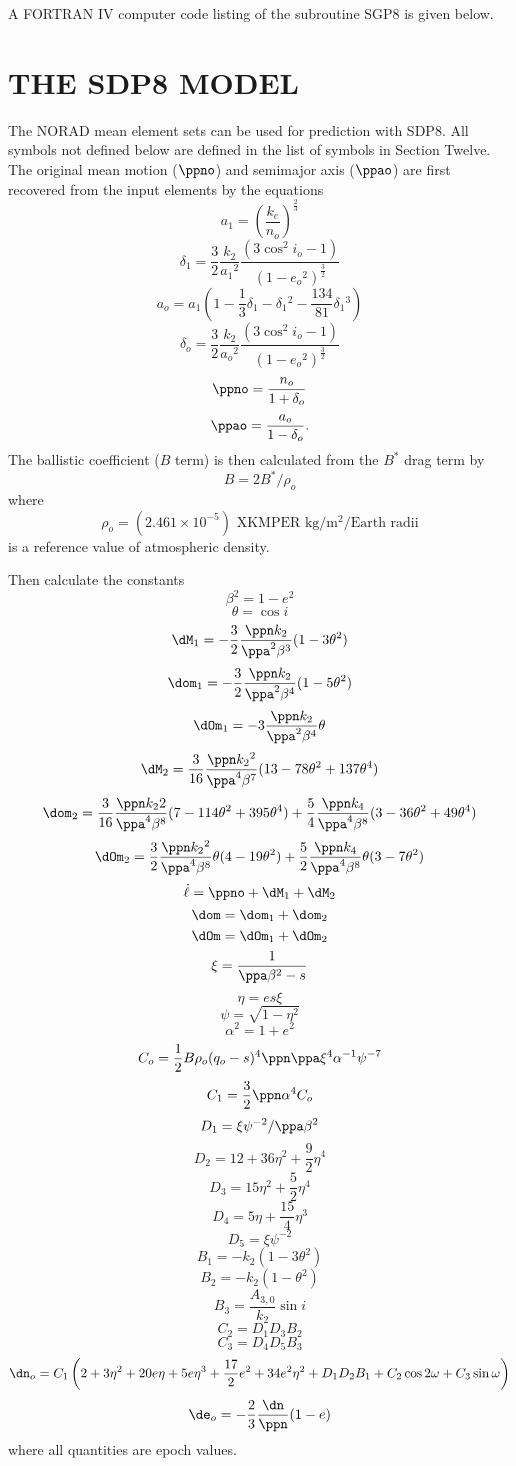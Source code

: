 A FORTRAN IV computer code listing of the subroutine SGP8 is given below.
\newpage

\newpage
\section[The SDP8 Model]{THE SDP8 MODEL}
The NORAD mean element sets can be used for prediction with SDP8.  All symbols
not defined below are defined in the list of symbols in Section Twelve.  The
original mean motion ($\ppno$) and semimajor axis ($\ppao$) are first
recovered from the input elements by the equations
\[a_1=\left(\dfrac{k_e}{n_o}\right)^{\frac23}\]
\[\delta_1=\frac32\frac{k_2}{a_1{}^2}\frac{(3\cos^2i_o-1)}
{(1-e_o{}^2)^\frac32}\]
\[a_o=a_1\left(1-\dfrac13\delta_1-\delta_1{}^2
-\dfrac{134}{81}\delta_1{}^3\right)\]
\[\delta_o=\dfrac32\dfrac{k_2}{a_o{}^2}\dfrac{(3\cos^2i_o-1)}
{(1-e_o{}^2)^{\frac32}}\]
\[\ppno =\dfrac{n_o}{1+\delta_o}\]
\[\ppao=\dfrac{a_o}{1-\delta_o}.\]
The ballistic coefficient ($B$ term) is then calculated from the $B^*$ drag
term by
\[B=2B^*/\rho_o\]
where
\[\rho_o=(2.461\times 10^{-5})\mbox{ XKMPER kg/m$^2$/Earth radii}\]
is a reference value of atmospheric density.

Then calculate the constants
\[\beta^2=1-e^2\]
\[\theta=\cos i\]
\[\dM_1=-\dfrac32\dfrac{\ppn k_2}{\ppa^2\beta^3}(1-3\theta^2)\]
\[\dom_1=-\dfrac32\dfrac{\ppn k_2}{\ppa^2\beta^4}(1-5\theta^2)\]
\[\dOm_1=-3\dfrac{\ppn k_2}{\ppa^2\beta^4}\theta\]
\[\dM_2=\dfrac3{16}\dfrac{\ppn k_2{}^2}{\ppa^4\beta^7}(13-
78\theta^2+137\theta^4)\]
\[\dom_2=\dfrac3{16}\dfrac{\ppn k_2{}2}{\ppa^4\beta^8}(7-
114\theta^2+395\theta^4)+\dfrac54\dfrac{\ppn k_4}{\ppa^4\beta^8}(3-
36\theta^2+49\theta^4)\]
\[\dOm_2=\dfrac32\dfrac{\ppn k_2{}^2}{\ppa^4\beta^8}\theta(4-19\theta^2)
+\dfrac52\dfrac{\ppn k_4}{\ppa^4\beta^8}\theta(3-7\theta^2)\]
\[\dot\ell=\ppno+\dM_1+\dM_2\]
\[\dom=\dom_1+\dom_2\]
\[\dOm=\dOm_1+\dOm_2\]
\[\xi=\dfrac1{\ppa\beta^2-s}\]
\[\eta=es\xi\]
\[\psi=\sqrt{1-\eta^2}\]
\[\alpha^2=1+e^2\]
\[C_o=\dfrac12B\rho_o(q_o-s)^4\ppn\ppa\xi^4\alpha^{-1}\psi^{-7}\]
\[C_1=\dfrac32\ppn\alpha^4C_o\]
\[D_1=\xi\psi^{-2}/\ppa\beta^2\]
\[D_2=12+36\eta^2+\dfrac92\eta^4\]
\[D_3=15\eta^2+\dfrac52\eta^4\]
\[D_4=5\eta+\dfrac{15}4\eta^3\]
\[D_5=\xi\psi^{-2}\]
\[B_1=-k_2(1-3\theta^2)\]
\[B_2=-k_2(1-\theta^2)\]
\[B_3=\dfrac{A_{3,0}}{k_2}\sin i\]
\[C_2=D_1D_3B_2\]
\[C_3=D_4D_5B_3\]
\[\dn_o=C_1\left(2+3\eta^2+20e\eta+5e\eta^3+\dfrac{17}2e^2+34e^2\eta^2+D_1D_2B_1
+C_2\cos 2\omega+C_3\sin\omega\right)\]
\[\de_o=-\dfrac23\dfrac{\dn}{\ppn}(1-e)\]
where all quantities are epoch values.

